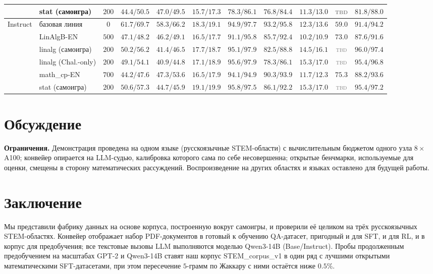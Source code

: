\documentclass{article}
\newcommand{\tbd}{\textcolor{gray}{\textsc{tbd}}}
\begin{document}
\begin{table}[t]
{\begin{tabular}{llccccccccc}
      & stat (самоигра)      & $200$  & $44.4/50.5$& $47.0/49.5$& $15.7/17.3$& $78.3/86.1$& $76.8/84.4$& $11.3/13.0$& \tbd& $81.8/88.0$ \\
    \midrule
    \multirow{6}{*}{Instruct}
      & базовая линия        & $0$    & $\mathbf{61.7}/69.7$& $\mathbf{58.3}/66.2$& $18.3/19.1$& $94.9/97.7$& $\mathbf{93.2}/95.8$& $12.3/13.6$& $59.0$& $91.4/94.2$ \\
      & LinAlgB-EN           & $500$  & $47.1/48.2$& $46.2/49.1$& $16.5/17.7$& $91.1/95.8$& $85.7/92.4$& $10.2/10.9$& $73.0$& $87.6/91.6$ \\
      & linalg (самоигра)    & $200$  & $50.2/56.2$& $41.4/46.5$& $17.7/18.7$& $95.1/97.9$& $82.5/88.8$& $14.5/16.1$& \tbd& $\mathbf{96.0}/97.4$ \\
      & linalg (Chal.-only)  & $200$  & $49.1/54.1$& $40.9/44.8$& $17.1/18.9$& $95.6/97.9$& $78.3/86.1$& $\mathbf{15.3}/17.0$& \tbd& $95.4/96.8$ \\
      & math\_cp-EN          & $700$  & $44.2/47.6$& $47.3/53.6$& $16.5/17.9$& $94.1/94.9$& $90.3/93.9$& $11.7/12.3$& $75.3$& $88.2/93.6$ \\
      & stat (самоигра)      & $200$  & $50.6/57.3$& $44.7/45.9$& $\mathbf{19.1}/19.9$& $\mathbf{95.8}/97.5$& $86.1/92.2$& $\mathbf{15.3}/17.0$& \tbd& $95.4/97.2$ \\
    \bottomrule
  \end{tabular}}
\end{table}

\section{Обсуждение}\label{sec:disc}

\textbf{Ограничения.} Демонстрация проведена на одном языке (русскоязычные STEM-области) с вычислительным бюджетом одного узла $8\!\times\!$A100; конвейер опирается на LLM-судью, калибровка которого сама по себе несовершенна; открытые бенчмарки, используемые для оценки, смещены в сторону математических рассуждений. Воспроизведение на других областях и языках оставлено для будущей работы.

\section{Заключение}\label{sec:concl}

Мы представили фабрику данных на основе корпуса, построенную вокруг самоигры, и проверили её целиком на трёх русскоязычных STEM-областях. Конвейер отображает набор PDF-документов в готовый к обучению QA-датасет, пригодный и для SFT, и для RL, и в корпус для предобучения; все текстовые вызовы LLM выполняются моделью Qwen3-14B (Base/Instruct). Пробы продолженным предобучением на масштабах GPT-2 и Qwen3-14B ставят наш корпус STEM\_corpus\_v1 в один ряд с лучшими открытыми математическими SFT-датасетами, при этом пересечение $5$-грамм по Жаккару с ними остаётся ниже $0.5\%$.
\end{document}
